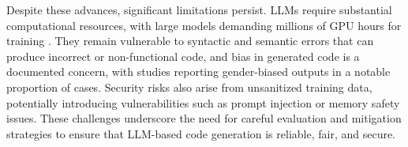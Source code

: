 Despite these advances, significant limitations persist. LLMs require substantial computational resources, with large models demanding millions of GPU hours for training \cite{huynh2025largelanguagemodelscode}. They remain vulnerable to syntactic and semantic errors that can produce incorrect or non-functional code, and bias in generated code is a documented concern, with studies reporting gender-biased outputs in a notable proportion of cases. Security risks also arise from unsanitized training data, potentially introducing vulnerabilities such as prompt injection or memory safety issues. These challenges underscore the need for careful evaluation and mitigation strategies to ensure that LLM-based code generation is reliable, fair, and secure.
